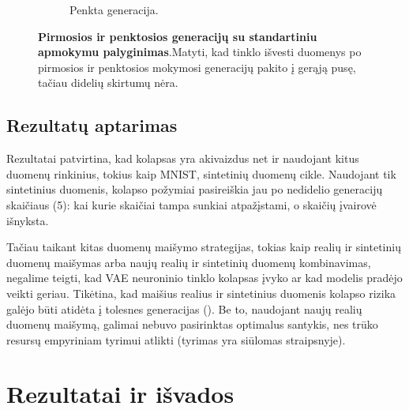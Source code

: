 \documentclass{VUMIFInfKursinis}
\begin{document}
\begin{figure}[H]
\begin{subfigure}[t]{0.45\textwidth}
        \caption{Penkta generacija.}
        \label{img:image2}
    \end{subfigure}
    \caption{\textbf{Pirmosios ir penktosios generacijų su standartiniu apmokymu palyginimas}.Matyti, kad tinklo išvesti duomenys po pirmosios ir penktosios mokymosi generacijų pakito į gerąją pusę, tačiau didelių skirtumų nėra.}
    \label{img:original_gen_1_5}
\end{figure}


\subsection{Rezultatų aptarimas}

Rezultatai patvirtina, kad kolapsas yra akivaizdus net ir naudojant kitus duomenų rinkinius, tokius kaip MNIST, sintetinių duomenų cikle. Naudojant tik sintetinius duomenis, kolapso požymiai pasireiškia jau po nedidelio generacijų skaičiaus (5): kai kurie skaičiai tampa sunkiai atpažįstami, o skaičių įvairovė išnyksta. 

Tačiau taikant kitas duomenų maišymo strategijas, tokias kaip realių ir sintetinių duomenų maišymas arba naujų realių ir sintetinių duomenų kombinavimas, negalime teigti, kad VAE neuroninio tinklo kolapsas įvyko ar kad modelis pradėjo veikti geriau. Tikėtina, kad maišius realius ir sintetinius duomenis kolapso rizika galėjo būti atidėta į tolesnes generacijas (\cite{AICollapseNature}). Be to, naudojant naujų realių duomenų maišymą, galimai nebuvo pasirinktas optimalus santykis, nes trūko resursų empyriniam tyrimui atlikti (tyrimas yra siūlomas \cite{DesniuPasiulymai} straipsnyje).



\section{Rezultatai ir išvados}
\end{document}
